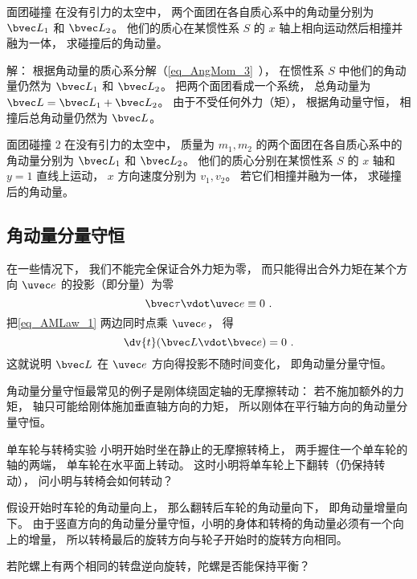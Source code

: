 \begin{example}{面团碰撞}
在没有引力的太空中， 两个面团在各自质心系中的角动量分别为 $\bvec L_1$ 和 $\bvec L_2$。 他们的质心在某惯性系 $S$ 的 $x$ 轴上相向运动然后相撞并融为一体， 求碰撞后的角动量。

解： 根据角动量的质心系分解（\autoref{eq_AngMom_3}~）， 在惯性系 $S$ 中他们的角动量仍然为 $\bvec L_1$ 和 $\bvec L_2$。 把两个面团看成一个系统， 总角动量为 $\bvec L = \bvec L_1 + \bvec L_2$。 由于不受任何外力（矩）， 根据角动量守恒， 相撞后总角动量仍然为 $\bvec L$。
\end{example}

\begin{exercise}{面团碰撞 2}
在没有引力的太空中， 质量为 $m_1, m_2$ 的两个面团在各自质心系中的角动量分别为 $\bvec L_1$ 和 $\bvec L_2$。 他们的质心分别在某惯性系 $S$ 的 $x$ 轴和 $y = 1$ 直线上运动， $x$ 方向速度分别为 $v_1, v_2$。 若它们相撞并融为一体， 求碰撞后的角动量。
\end{exercise}

\subsection{角动量分量守恒}
在一些情况下， 我们不能完全保证合外力矩为零， 而只能得出合外力矩在某个方向 $\uvec e$ 的投影（即分量）为零
\begin{equation}
\bvec \tau \vdot \uvec e \equiv 0~.
\end{equation}
把\autoref{eq_AMLaw_1} 两边同时点乘 $\uvec e$， 得
\begin{equation}
\dv{t} (\bvec L \vdot \bvec e) = 0~.
\end{equation}
这就说明 $\bvec L$ 在 $\uvec e$ 方向得投影不随时间变化， 即角动量分量守恒。

角动量分量守恒最常见的例子是刚体绕固定轴的无摩擦转动： 若不施加额外的力矩， 轴只可能给刚体施加垂直轴方向的力矩， 所以刚体在平行轴方向的角动量分量守恒。

\begin{example}{单车轮与转椅实验}
小明开始时坐在静止的无摩擦转椅上， 两手握住一个单车轮的轴的两端， 单车轮在水平面上转动。 这时小明将单车轮上下翻转（仍保持转动）， 问小明与转椅会如何转动？

假设开始时车轮的角动量向上， 那么翻转后车轮的角动量向下， 即角动量增量向下。 由于竖直方向的角动量分量守恒，小明的身体和转椅的角动量必须有一个向上的增量， 所以转椅最后的旋转方向与轮子开始时的旋转方向相同。
\end{example}

\begin{exercise}{}
若陀螺上有两个相同的转盘逆向旋转，陀螺是否能保持平衡？
\end{exercise}

